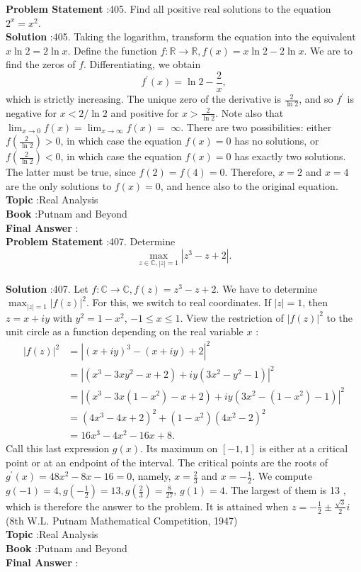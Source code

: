 \documentclass[10pt]{article}
\begin{document}
\textbf{Problem Statement} :405. Find all positive real solutions to the equation $2^{x}=x^{2}$.\\
\textbf{Solution} :405. Taking the logarithm, transform the equation into the equivalent $x \ln 2=2 \ln x$. Define the function $f: \mathbb{R} \rightarrow \mathbb{R}, f(x)=x \ln 2-2 \ln x$. We are to find the zeros of $f$. Differentiating, we obtain$$ f^{\prime}(x)=\ln 2-\frac{2}{x}, $$which is strictly increasing. The unique zero of the derivative is $\frac{2}{\ln 2}$, and so $f^{\prime}$ is negative for $x<2 / \ln 2$ and positive for $x>\frac{2}{\ln 2}$. Note also that $\lim _{x \rightarrow 0} f(x)=\lim _{x \rightarrow \infty} f(x)=$ $\infty$. There are two possibilities: either $f\left(\frac{2}{\ln 2}\right)>0$, in which case the equation $f(x)=0$ has no solutions, or $f\left(\frac{2}{\ln 2}\right)<0$, in which case the equation $f(x)=0$ has exactly two solutions. The latter must be true, since $f(2)=f(4)=0$. Therefore, $x=2$ and $x=4$ are the only solutions to $f(x)=0$, and hence also to the original equation.\\
\textbf{Topic} :Real Analysis\\
\textbf{Book} :Putnam and Beyond\\
\textbf{Final Answer} :\\


\textbf{Problem Statement} :407. Determine$$ \max _{z \in \mathbb{C},|z|=1}\left|z^{3}-z+2\right| . $$\\
\textbf{Solution} :407. Let $f: \mathbb{C} \rightarrow \mathbb{C}, f(z)=z^{3}-z+2$. We have to determine $\max _{|z|=1}|f(z)|^{2}$. For this, we switch to real coordinates. If $|z|=1$, then $z=x+i y$ with $y^{2}=1-x^{2}$, $-1 \leq x \leq 1$. View the restriction of $|f(z)|^{2}$ to the unit circle as a function depending on the real variable $x$ :$$ \begin{aligned} |f(z)|^{2} &=\left|(x+i y)^{3}-(x+i y)+2\right|^{2} \\ &=\left|\left(x^{3}-3 x y^{2}-x+2\right)+i y\left(3 x^{2}-y^{2}-1\right)\right|^{2} \\ &=\left|\left(x^{3}-3 x\left(1-x^{2}\right)-x+2\right)+i y\left(3 x^{2}-\left(1-x^{2}\right)-1\right)\right|^{2} \\ &=\left(4 x^{3}-4 x+2\right)^{2}+\left(1-x^{2}\right)\left(4 x^{2}-2\right)^{2} \\ &=16 x^{3}-4 x^{2}-16 x+8 . \end{aligned} $$Call this last expression $g(x)$. Its maximum on $[-1,1]$ is either at a critical point or at an endpoint of the interval. The critical points are the roots of $g^{\prime}(x)=48 x^{2}-8 x-16=0$, namely, $x=\frac{2}{3}$ and $x=-\frac{1}{2}$. We compute $g(-1)=4, g\left(-\frac{1}{2}\right)=13, g\left(\frac{2}{3}\right)=\frac{8}{27}$, $g(1)=4$. The largest of them is 13 , which is therefore the answer to the problem. It is attained when $z=-\frac{1}{2} \pm \frac{\sqrt{3}}{2} i$(8th W.L. Putnam Mathematical Competition, 1947)\\
\textbf{Topic} :Real Analysis\\
\textbf{Book} :Putnam and Beyond\\
\textbf{Final Answer} :\\
\end{document}
